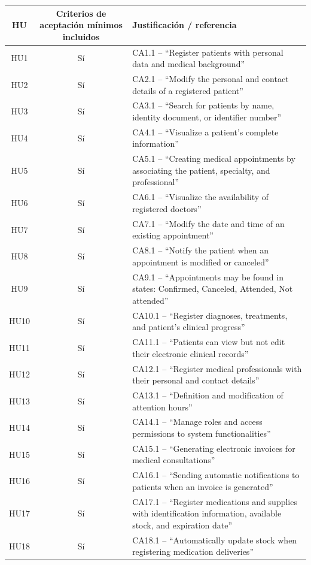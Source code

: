 \begin{longtable}{|c|c|p{6cm}|}
\hline
\textbf{HU} & \textbf{Criterios de aceptación mínimos incluidos} & \textbf{Justificación / referencia} \\
\hline
HU1 & Sí & CA1.1 – “Register patients with personal data and medical background” \\
\hline
HU2 & Sí & CA2.1 – “Modify the personal and contact details of a registered patient” \\
\hline
HU3 & Sí & CA3.1 – “Search for patients by name, identity document, or identifier number” \\
\hline
HU4 & Sí & CA4.1 – “Visualize a patient's complete information” \\
\hline
HU5 & Sí & CA5.1 – “Creating medical appointments by associating the patient, specialty, and professional” \\
\hline
HU6 & Sí & CA6.1 – “Visualize the availability of registered doctors” \\
\hline
HU7 & Sí & CA7.1 – “Modify the date and time of an existing appointment” \\
\hline
HU8 & Sí & CA8.1 – “Notify the patient when an appointment is modified or canceled” \\
\hline
HU9 & Sí & CA9.1 – “Appointments may be found in states: Confirmed, Canceled, Attended, Not attended” \\
\hline
HU10 & Sí & CA10.1 – “Register diagnoses, treatments, and patient's clinical progress” \\
\hline
HU11 & Sí & CA11.1 – “Patients can view but not edit their electronic clinical records” \\
\hline
HU12 & Sí & CA12.1 – “Register medical professionals with their personal and contact details” \\
\hline
HU13 & Sí & CA13.1 – “Definition and modification of attention hours” \\
\hline
HU14 & Sí & CA14.1 – “Manage roles and access permissions to system functionalities” \\
\hline
HU15 & Sí & CA15.1 – “Generating electronic invoices for medical consultations” \\
\hline
HU16 & Sí & CA16.1 – “Sending automatic notifications to patients when an invoice is generated” \\
\hline
HU17 & Sí & CA17.1 – “Register medications and supplies with identification information, available stock, and expiration date” \\
\hline
HU18 & Sí & CA18.1 – “Automatically update stock when registering medication deliveries” \\

\end{longtable}
